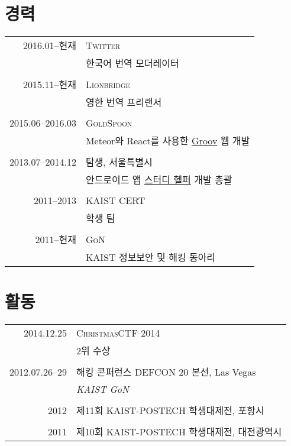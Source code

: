 \documentclass[a4paper,10pt]{article}
\begin{document}
\section{경력}
\begin{tabular}{r|p{11cm}}
  \textsc{2016.01--현재} & \textsc{Twitter} \\
                           & 한국어 번역 모더레이터 \\
  \multicolumn{2}{c}{} \\

  \textsc{2015.11--현재} & \textsc{Lionbridge} \\
                           & 영한 번역 프리랜서 \\
  \multicolumn{2}{c}{} \\

  \textsc{2015.06--2016.03} & \textsc{GoldSpoon} \\
                            & Meteor와 React를 사용한 \href{http://groov.fm}{Groov} 웹 개발 \\
  \multicolumn{2}{c}{} \\

  \textsc{2013.07--2014.12} & \textsc{탐생}, 서울특별시 \\
                            & 안드로이드 앱 \href{https://play.google.com/store/apps/details?id=kr.co.tamseng.StudyHelper}{스터디 헬퍼} 개발 총괄 \\
  \multicolumn{2}{c}{} \\

  \textsc{2011--2013} & \textsc{KAIST CERT} \\
                      & 학생 팀 \\
  \multicolumn{2}{c}{} \\

  \textsc{2011--현재} & \textsc{GoN} \\
                        & KAIST 정보보안 및 해킹 동아리 \\
\end{tabular}

\section{활동}
\begin{tabular}{r|p{11cm}}
  \textsc{2014.12.25} & \textsc{ChristmasCTF 2014} \\
                      & 2위 수상 \\
  \multicolumn{2}{c}{} \\

  \textsc{2012.07.26--29} & \textsc{해킹 콘퍼런스 DEFCON 20 본선}, Las Vegas \\
                          & \emph{KAIST GoN} \\
  \multicolumn{2}{c}{} \\

  \textsc{2012} & \textsc{제11회 KAIST-POSTECH 학생대제전}, 포항시 \\
  \multicolumn{2}{c}{} \\

  \textsc{2011} & \textsc{제10회 KAIST-POSTECH 학생대제전}, 대전광역시 \\
\end{tabular}
\end{document}
